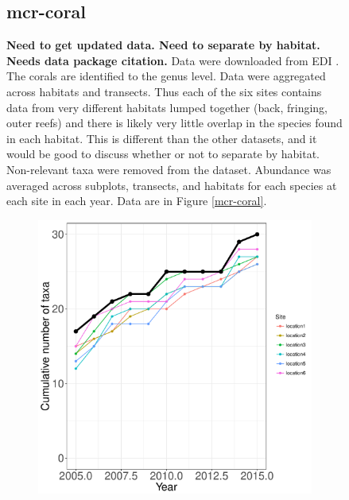 \documentclass[11pt, oneside]{article}
\begin{document}
\begin{figure}[h!]
\subsection {mcr-coral}
{\bf Need to get updated data. Need to separate by habitat. Needs data package citation.}
Data were downloaded from EDI \citep{mcr-coral}.
The corals are identified to the genus level.
Data were aggregated across habitats and transects.
Thus each of the six sites contains data from very different habitats lumped together (back, fringing, outer reefs) and there is likely very little overlap in the species found in each habitat. 
This is different than the other datasets, and it would be good to discuss whether or not to separate by habitat.
Non-relevant taxa were removed from the dataset.
Abundance was averaged across subplots, transects, and habitats for each species at each site in each year.
Data are in Figure \ref{mcr-coral}.
\begin{figure}[h!]
\centering
\includegraphics[scale = 0.4]{mcr-coral-castorani_species_accumulation_curve.pdf}

\end{figure}
\end{figure}
\end{document}
